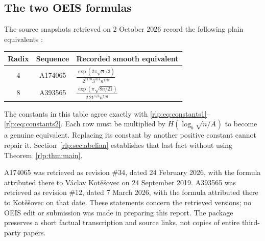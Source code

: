 \documentclass[11pt,letterpaper]{article}
\numberwithin{equation}{section}
\theoremstyle{remark}\newtheorem{remark}[theorem]{Remark}
\begin{document}
\subsection{The two OEIS formulas}\label{rlp:sec:oeis}
The source snapshots retrieved on 2 October 2026 record the following plain equivalents \cite{oeis4,oeis8}:
\begin{center}
\begin{tabular}{@{}ccl@{}}
\toprule
Radix & Sequence & Recorded smooth equivalent \\
\midrule
$4$ & A174065 & $\displaystyle\frac{\exp(2\pi\sqrt n/3)}{2^{11/8}3^{3/4}n^{7/8}}$ \\[6pt]
$8$ & A393565 & $\displaystyle\frac{\exp(\pi\sqrt{8n/21})}{2\,21^{1/3}n^{5/6}}$ \\[4pt]
\bottomrule
\end{tabular}
\end{center}
The constants in this table agree exactly with \eqref{rlp:eq:constants1}--\eqref{rlp:eq:constants2}. Each row must be multiplied by
$H(\log_b\sqrt{n/A})$ to become a genuine equivalent. Replacing its constant by another positive constant cannot repair it. Section~\ref{rlp:sec:abelian} establishes that last fact without using Theorem~\ref{rlp:thm:main}.

A174065 was retrieved as revision \#34, dated 24 February 2026, with the formula attributed there to V\'aclav Kot\v{e}\v{s}ovec on 24 September 2019. A393565 was retrieved as revision \#12, dated 7 March 2026, with the formula attributed there to Kot\v{e}\v{s}ovec on that date. These statements concern the retrieved versions; no OEIS edit or submission was made in preparing this report. The package preserves a short factual transcription and source links, not copies of entire third-party papers.
\end{document}
